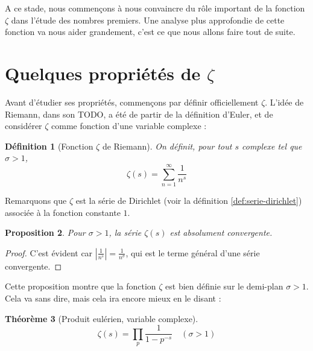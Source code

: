 \documentclass[french]{report}
\newtheorem{theorem}{Théorème}[section]
\newtheorem{definition}[theorem]{Définition}
\newtheorem{proposition}[theorem]{Proposition}
\begin{document}
A ce stade, nous commençons à nous convaincre du rôle important de la fonction $\zeta$ dans l'étude des nombres premiers. Une analyse plus approfondie de cette fonction va nous aider grandement, c'est ce que nous allons faire tout de suite.

\section{Quelques propriétés de $\zeta$}

Avant d'étudier ses propriétés, commençons par définir officiellement $\zeta$. L'idée de Riemann, dans son TODO, a été de partir de la définition d'Euler, et de considérer $\zeta$ comme fonction d'une variable complexe :

\begin{definition}[Fonction $\zeta$ de Riemann]\label{def:zeta-definition}
  On définit, pour tout $s$ complexe tel que $\sigma > 1$,
  \[ \zeta(s) = \sum_{n=1}^{\infty}\frac{1}{n^s} \]
\end{definition}

Remarquons que $\zeta$ est la série de Dirichlet (voir la définition \ref{def:serie-dirichlet}) associée à la fonction constante $1$.

\begin{proposition}
  Pour $\sigma > 1$, la série $\zeta(s)$ est absolument convergente.
\end{proposition}

\begin{proof}
  C'est évident car $|\frac{1}{n^s}| = \frac{1}{n^{\sigma}}$, qui est le terme général d'une série convergente.
\end{proof}

Cette proposition montre que la fonction $\zeta$ est bien définie sur le demi-plan $\sigma > 1$.
\\

Cela va sans dire, mais cela ira encore mieux en le disant :

\begin{theorem}[Produit eulérien, variable complexe]\label{thm:produit-eulerien-complexe}
  \[ \zeta(s) = \prod_p\frac{1}{1-p^{-s}}\quad(\sigma>1)\]
\end{theorem}
\end{document}
